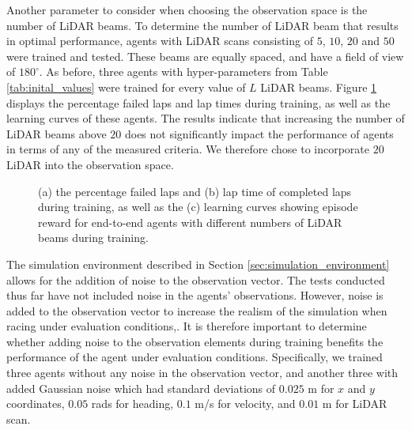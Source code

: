 Another parameter to consider when choosing the observation space is the number of LiDAR beams.
To determine the number of LiDAR beam that results in optimal performance, agents with LiDAR scans consisting of $5$, $10$, $20$ and $50$ were trained and tested.
These beams are equally spaced, and have a field of view of $180^{\circ}$.
As before, three agents with hyper-parameters from Table \ref{tab:inital_values} were trained for every value of $L$ LiDAR beams.
Figure \ref{fig:n_beams} displays the percentage failed laps and lap times during training, as well as the learning curves of these agents.
The results indicate that increasing the number of LiDAR beams above $20$ does not significantly impact the performance of agents in terms of any of the measured criteria. 
We therefore chose to incorporate $20$ LiDAR into the observation space.

\begin{figure}[htb!]
    \centering
    
    \caption[Learning curves of agents with different numbers of LiDAR beams during training]{(a) the percentage failed laps and (b) lap time of completed laps during training, as well as the (c) learning curves showing episode reward for end-to-end agents with different numbers of LiDAR beams during training.}
    \label{fig:n_beams}
\end{figure}

The simulation environment described in Section \ref{sec:simulation_environment} allows for the addition of noise to the observation vector.
The tests conducted thus far have not included noise in the agents' observations.
However, noise is added to the observation vector to increase the realism of the simulation when racing under evaluation conditions,.
It is therefore important to determine whether adding noise to the observation elements during training benefits the performance of the agent under evaluation conditions.
Specifically, we trained three agents without any noise in the observation vector, and another three with added Gaussian noise which had standard deviations of $0.025$ m for $x$ and $y$ coordinates, $0.05$ rads for heading, $0.1$ m/s for velocity, and $0.01$ m for LiDAR scan.

